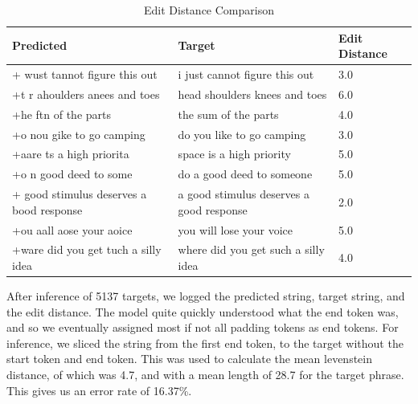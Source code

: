 \documentclass[preprint,11pt,review,authoryear]{elsarticle}
\begin{document}
\begin{table}[htbp]
    \centering
    \caption{Edit Distance Comparison}
    \begin{tabular}{lll}
        \toprule
        Predicted                                & Target                                   & Edit Distance \\
        \midrule
        + wust tannot figure this out            & i just cannot figure this out            & 3.0           \\
        +t r ahoulders anees and toes            & head shoulders knees and toes            & 6.0           \\
        +he ftn of the parts                     & the sum of the parts                     & 4.0           \\
        +o nou gike to go camping                & do you like to go camping                & 3.0           \\
        +aare ts a high priorita                 & space is a high priority                 & 5.0           \\
        +o n good deed to some                   & do a good deed to someone                & 5.0           \\
        + good stimulus deserves a bood response & a good stimulus deserves a good response & 2.0           \\
        +ou aall aose your aoice                 & you will lose your voice                 & 5.0           \\
        +ware did you get tuch a silly idea      & where did you get such a silly idea      & 4.0           \\
        
        \bottomrule
    \end{tabular}
    \label{tab:edit_distance}
\end{table}

After inference of 5137 targets, we logged the predicted string, target string, and the edit distance. The model quite quickly understood what the end token was, and so we eventually assigned most if not all padding tokens as end tokens. For inference, we sliced the string from the first end token, to the target without the start token and end token. This was used to calculate the mean levenstein distance, of which was 4.7, and with a mean length of 28.7 for the target phrase. This gives us an error rate of 16.37\%.
\end{document}
